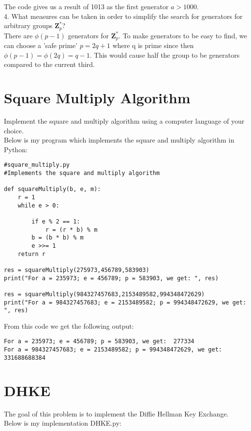 \documentclass{article}
\begin{document}
The code gives us a result of 1013 as the first generator $a > 1000$.\\

4. What measures can be taken in order to simplify the search for generators for
arbitrary groups $\textbf{Z}_{p}^*$?\\

There are $\phi(p-1)$ generators for $\textbf{Z}_{p}^*$. To make generators to be easy to find, we can choose a 'safe prime' $p=2q+1$ where q is prime since then $\phi(p-1)=\phi(2q)=q-1$. This would cause half the group to be generators compared to the current third.

\section{Square Multiply Algorithm} Implement the square and multiply algorithm using a computer language of your choice.\\

Below is my program which implements the square and multiply algorithm in Python:

\begin{framed}
\begin{verbatim}
#square_multiply.py
#Implements the square and multiply algorithm

def squareMultiply(b, e, m):
    r = 1
    while e > 0:

        if e % 2 == 1:
            r = (r * b) % m
        b = (b * b) % m
        e >>= 1
    return r

res = squareMultiply(275973,456789,583903)
print("For a = 235973; e = 456789; p = 583903, we get: ", res)

res = squareMultiply(984327457683,2153489582,994348472629)
print("For a = 984327457683; e = 2153489582; p = 994348472629, we get: ", res)

\end{verbatim}
\end{framed}

From this code we get the following output:

\begin{framed}
\begin{verbatim}
For a = 235973; e = 456789; p = 583903, we get:  277334
For a = 984327457683; e = 2153489582; p = 994348472629, we get:  331688688384
\end{verbatim}
\end{framed}

\section{DHKE}
The goal of this problem is to implement the Diffie Hellman Key Exchange. Below is my implementation DHKE.py:
\end{document}
